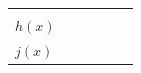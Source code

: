 {\begin{tabular}[t]{|l|l|l|l|l|l|}
         &
         &
     \tabularnewline\cline{1-1}\cline{2-2}\cline{3-3}\cline{4-4}\cline{5-5}\cline{6-6}
                  $h\left(x\right)$
                 &
         &
         &
         &
         &
     \tabularnewline\cline{1-1}\cline{2-2}\cline{3-3}\cline{4-4}\cline{5-5}\cline{6-6}
                  $j\left(x\right)$
                 &
         &

\end{tabular}}
